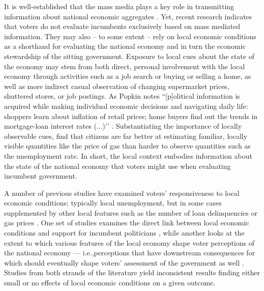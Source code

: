 \documentclass[12pt,a4paper]{article}
\begin{document}
	It is well-established that the mass media plays a key role in transmitting information about national economic aggregates \citep[e.g.,][]{soroka2015s}. Yet, recent research indicates that voters do not evaluate incumbents exclusively based on mass mediated information. They may also – to some extent -- rely on local economic conditions as a shorthand for evaluating the national economy \citep{bisgaard2016reconsidering, reeves2012ecologies} and in turn the economic stewardship of the sitting government. Exposure to local cues about the state of the economy may stem from both direct, personal involvement with the local economy through activities such as a job search or buying or selling a home, as well as more indirect casual observation of changing supermarket prices, shuttered stores, or job postings. As Popkin \citeyearpar[][p. 24]{popkin1994reasoning} notes ``[p]olitical information is acquired while making individual economic decisions and navigating daily life: shoppers learn about inflation of retail prices; home buyers find out the trends in mortgage-loan interest rates (...)’’ \cite[see also][p. 5]{fiorina1981retrospective}. Substantiating the importance of locally observable cues, \citep{ansolabehere2012asking} find that citizens are far better at estimating familiar, locally visible quantities like the price of gas than harder to observe quantities such as the unemployment rate. In short, the local context embodies information about the state of the national economy that voters might use when evaluating incumbent government. 
	
	A number of previous studies have examined voters’ responsiveness to local economic conditions; typically local unemployment, but in some cases supplemented by other local features such as the number of loan delinquencies \citep{healy2017presidential} or gas prices \citep{reeves2012ecologies}. One set of studies examines the direct link between local economic conditions and support for incumbent politicians \citep{hansford2015reevaluating,eisenberg2004economic,kim2003spatial,healy2017presidential, auberger2005influence,wright2012unemployment,hill2010economic,elinder2010local,johnston2001s,veiga2010impact}, while another looks at the extent to which various features of the local economy shape voter perceptions of the national economy — i.e.,perceptions that have downstream consequences for which should eventually shape voters’ assessment of the government as well  \citep{books1999contextual, reeves2012ecologies,anderson2011local,ansolabehere2014mecro,bisgaard2016reconsidering}. Studies from both strands of the literature yield inconsistent results finding either small or no effects of local economic conditions on a given outcome.   
	
\end{document}
